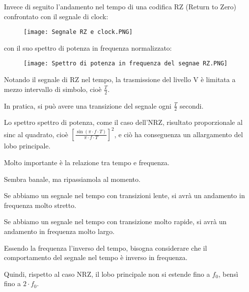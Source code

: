 Invece di seguito l'andamento nel tempo di una codifica RZ (Return to Zero) confrontato con il segnale di clock: 

\begin{figure}[h]
    \centering
    \texttt{[image: Segnale RZ e clock.PNG]}
\end{figure} 

con il suo spettro di potenza in frequenza normalizzato: 

\begin{figure}[h]
    \centering
    \texttt{[image: Spettro di potenza in frequenza del segnae RZ.PNG]}
\end{figure} 

Notando il segnale di RZ nel tempo, la trasmissione del livello V è limitata a mezzo intervallo di simbolo, cioè $\frac{T}{2}$. \newline 

In pratica, si può avere una transizione del segnale ogni $\frac{T}{2}$ secondi. \newline 

Lo spettro spettro di potenza, come il caso dell'NRZ, risultato proporzionale al sinc al quadrato, cioè $\left[ \frac{\sin(\pi \cdot f \cdot T)}{\pi \cdot f \cdot T}\right]^{2}$, 
e ciò ha conseguenza un allargamento del lobo principale. \newline 

\begin{tcolorbox}
    Molto importante è la relazione tra tempo e frequenza. \newline 

    Sembra banale, ma ripassiamola al momento. \newline 

    Se abbiamo un segnale nel tempo con transizioni lente, si avrà un andamento in frequenza molto stretto. \newline 

    Se abbiamo un segnale nel tempo con transizione molto rapide, si avrà un andamento in frequenza molto largo. \newline 

    Essendo la frequenza l'inverso del tempo, bisogna considerare che il comportamento del segnale nel tempo è inverso in frequenza.
\end{tcolorbox}

Quindi, rispetto al caso NRZ, il lobo principale non si estende fino a $f_0$, bensì fino a $2 \cdot f_0$. \newline 

